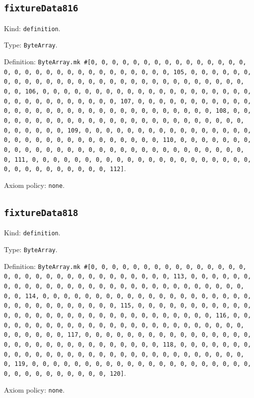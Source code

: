 \documentclass[11pt]{article}
\begin{document}
\subsection*{\texttt{fixtureData816}}
\noindent Kind: \texttt{definition}.\par
\noindent Type: \texttt{ByteArray}.\par
\noindent Definition: \texttt{ByteArray.mk \#[0, 0, 0, 0, 0, 0, 0, 0, 0, 0, 0, 0, 0, 0, 0, 0, 0, 0, 0, 0, 0, 0, 0, 0, 0, 0, 0, 0, 0, 0, 0, 105, 0, 0, 0, 0, 0, 0, 0, 0, 0, 0, 0, 0, 0, 0, 0, 0, 0, 0, 0, 0, 0, 0, 0, 0, 0, 0, 0, 0, 0, 0, 0, 106, 0, 0, 0, 0, 0, 0, 0, 0, 0, 0, 0, 0, 0, 0, 0, 0, 0, 0, 0, 0, 0, 0, 0, 0, 0, 0, 0, 0, 0, 0, 0, 107, 0, 0, 0, 0, 0, 0, 0, 0, 0, 0, 0, 0, 0, 0, 0, 0, 0, 0, 0, 0, 0, 0, 0, 0, 0, 0, 0, 0, 0, 0, 0, 108, 0, 0, 0, 0, 0, 0, 0, 0, 0, 0, 0, 0, 0, 0, 0, 0, 0, 0, 0, 0, 0, 0, 0, 0, 0, 0, 0, 0, 0, 0, 0, 109, 0, 0, 0, 0, 0, 0, 0, 0, 0, 0, 0, 0, 0, 0, 0, 0, 0, 0, 0, 0, 0, 0, 0, 0, 0, 0, 0, 0, 0, 0, 0, 110, 0, 0, 0, 0, 0, 0, 0, 0, 0, 0, 0, 0, 0, 0, 0, 0, 0, 0, 0, 0, 0, 0, 0, 0, 0, 0, 0, 0, 0, 0, 0, 111, 0, 0, 0, 0, 0, 0, 0, 0, 0, 0, 0, 0, 0, 0, 0, 0, 0, 0, 0, 0, 0, 0, 0, 0, 0, 0, 0, 0, 0, 0, 0, 112]}.\par
\noindent Axiom policy: \texttt{none}.\par
\subsection*{\texttt{fixtureData818}}
\noindent Kind: \texttt{definition}.\par
\noindent Type: \texttt{ByteArray}.\par
\noindent Definition: \texttt{ByteArray.mk \#[0, 0, 0, 0, 0, 0, 0, 0, 0, 0, 0, 0, 0, 0, 0, 0, 0, 0, 0, 0, 0, 0, 0, 0, 0, 0, 0, 0, 0, 0, 0, 113, 0, 0, 0, 0, 0, 0, 0, 0, 0, 0, 0, 0, 0, 0, 0, 0, 0, 0, 0, 0, 0, 0, 0, 0, 0, 0, 0, 0, 0, 0, 0, 114, 0, 0, 0, 0, 0, 0, 0, 0, 0, 0, 0, 0, 0, 0, 0, 0, 0, 0, 0, 0, 0, 0, 0, 0, 0, 0, 0, 0, 0, 0, 0, 115, 0, 0, 0, 0, 0, 0, 0, 0, 0, 0, 0, 0, 0, 0, 0, 0, 0, 0, 0, 0, 0, 0, 0, 0, 0, 0, 0, 0, 0, 0, 0, 116, 0, 0, 0, 0, 0, 0, 0, 0, 0, 0, 0, 0, 0, 0, 0, 0, 0, 0, 0, 0, 0, 0, 0, 0, 0, 0, 0, 0, 0, 0, 0, 117, 0, 0, 0, 0, 0, 0, 0, 0, 0, 0, 0, 0, 0, 0, 0, 0, 0, 0, 0, 0, 0, 0, 0, 0, 0, 0, 0, 0, 0, 0, 0, 118, 0, 0, 0, 0, 0, 0, 0, 0, 0, 0, 0, 0, 0, 0, 0, 0, 0, 0, 0, 0, 0, 0, 0, 0, 0, 0, 0, 0, 0, 0, 0, 119, 0, 0, 0, 0, 0, 0, 0, 0, 0, 0, 0, 0, 0, 0, 0, 0, 0, 0, 0, 0, 0, 0, 0, 0, 0, 0, 0, 0, 0, 0, 0, 120]}.\par
\noindent Axiom policy: \texttt{none}.\par
\end{document}
